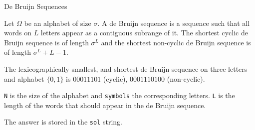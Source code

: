 \begin{algorithm}{De Bruijn Sequences}

\desc
Let $\Omega$ be an alphabet of size $\sigma$. A de Bruijn sequence is
a sequence such that all words on $L$ letters appear as a contiguous
subrange of it.  The shortest cyclic de Bruijn sequence is of
length $\sigma^L$ and the shortest non-cyclic de Bruijn sequence is of
length $\sigma^L+L-1$.

The lexicographically smallest, and shortest de Bruijn sequence on
three letters and alphabet $\{0,1\}$ is $00011101$ (cyclic),
$0001110100$ (non-cyclic).

{\tt N} is the size of the alphabet and {\tt symbols} the
corresponding letters. {\tt L} is the length of the words that should
appear in the de Bruijn sequence.

The answer is stored in the {\tt sol} string.
\end{algorithm}

